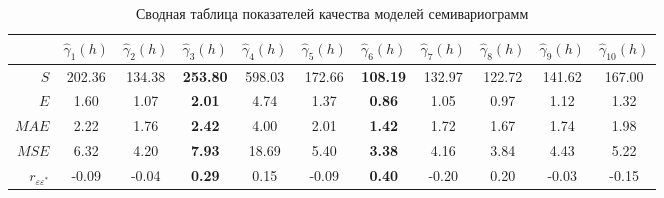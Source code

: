 \begin{table}[ht]
\centering
\caption{Сводная таблица показателей качества моделей семивариограмм}
\label{table:summary-cv}
{\footnotesize
\begin{tabular}{r|cccccccccc}
  \hline
 & $ \widehat{\gamma}_1(h) $ & $ \widehat{\gamma}_2(h) $ & \boldmath$ \widehat{\gamma}_3(h) $ & $ \widehat{\gamma}_4(h) $ & $ \widehat{\gamma}_5(h) $ & \boldmath$ \widehat{\gamma}_6(h) $ & $ \widehat{\gamma}_7(h) $ & $ \widehat{\gamma}_8(h) $ & $ \widehat{\gamma}_9(h) $ & $ \widehat{\gamma}_{10}(h) $ \\ 
  \hline
$ S $ & 202.36 & 134.38 & \textbf{253.80} & 598.03 & 172.66 & \textbf{108.19} & 132.97 & 122.72 & 141.62 & 167.00 \\ 
  $ E $ & 1.60 & 1.07 & \textbf{2.01} & 4.74 & 1.37 & \textbf{0.86} & 1.05 & 0.97 & 1.12 & 1.32 \\ 
  $ MAE $ & 2.22 & 1.76 & \textbf{2.42} & 4.00 & 2.01 & \textbf{1.42} & 1.72 & 1.67 & 1.74 & 1.98 \\ 
  $ MSE $ & 6.32 & 4.20 & \textbf{7.93} & 18.69 & 5.40 & \textbf{3.38} & 4.16 & 3.84 & 4.43 & 5.22 \\ 
  $ r_{\varepsilon\varepsilon^{*}} $ & -0.09 & -0.04 & \textbf{0.29} & 0.15 & -0.09 & \textbf{0.40} & -0.20 & 0.20 & -0.03 & -0.15 \\ 
   \hline
\end{tabular}
}
\end{table}

